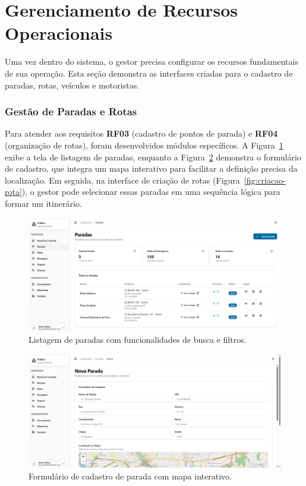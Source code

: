\section{Gerenciamento de Recursos Operacionais}

Uma vez dentro do sistema, o gestor precisa configurar os recursos fundamentais de sua operação. Esta seção demonstra as interfaces criadas para o cadastro de paradas, rotas, veículos e motoristas.

\subsubsection{Gestão de Paradas e Rotas}
Para atender aos requisitos \textbf{RF03} (cadastro de pontos de parada) e \textbf{RF04} (organização de rotas), foram desenvolvidos módulos específicos. A Figura~\ref{fig:listagem-paradas} exibe a tela de listagem de paradas, enquanto a Figura~\ref{fig:formulario-parada} demonstra o formulário de cadastro, que integra um mapa interativo para facilitar a definição precisa da localização. Em seguida, na interface de criação de rotas (Figura~\ref{fig:criacao-rota}), o gestor pode selecionar essas paradas em uma sequência lógica para formar um itinerário.

\begin{figure}[H]
  \centering
  \includegraphics[width=1\textwidth]{imagens/listagem-paradas.png}
  \caption{Listagem de paradas com funcionalidades de busca e filtros.}
  \label{fig:listagem-paradas}
\end{figure}

\begin{figure}[H]
  \centering
  \includegraphics[width=1\textwidth]{imagens/formulario-parada.png}
  \caption{Formulário de cadastro de parada com mapa interativo.}
  \label{fig:formulario-parada}
\end{figure}

